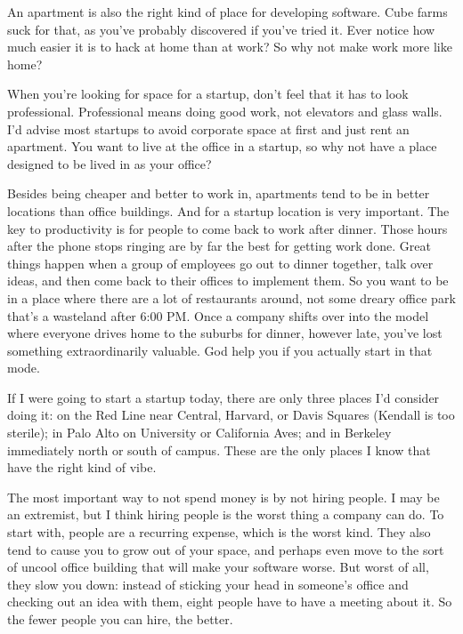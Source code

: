An apartment is also the right kind of
                    place for developing software. Cube farms suck for that, as
                    you've probably discovered if you've tried it. Ever notice
                    how much easier it is to hack at home than at work? So why
                    not make work more like home?

When you're looking
                    for space for a startup, don't feel that it has to look
                    professional. Professional means doing good work, not
                    elevators and glass walls. I'd advise most startups to avoid
                    corporate space at first and just rent an apartment. You
                    want to live at the office in a startup, so why not have a
                    place designed to be lived in as your office?

Besides
                    being cheaper and better to work in, apartments tend to be
                    in better locations than office buildings. And for a startup
                    location is very important. The key to productivity is for
                    people to come back to work after dinner. Those hours after
                    the phone stops ringing are by far the best for getting work
                    done. Great things happen when a group of employees go out
                    to dinner together, talk over ideas, and then come back to
                    their offices to implement them. So you want to be in a
                    place where there are a lot of restaurants around, not some
                    dreary office park that's a wasteland after 6:00 PM. Once a
                    company shifts over into the model where everyone drives
                    home to the suburbs for dinner, however late, you've lost
                    something extraordinarily valuable. God help you if you
                    actually start in that mode.

If I were going to
                    start a startup today, there are only three places I'd
                    consider doing it: on the Red Line near Central, Harvard, or
                    Davis Squares (Kendall is too sterile); in Palo Alto on
                    University or California Aves; and in Berkeley immediately
                    north or south of campus. These are the only places I know
                    that have the right kind of vibe.

The most
                    important way to not spend money is by not hiring people. I
                    may be an extremist, but I think hiring people is the worst
                    thing a company can do. To start with, people are a
                    recurring expense, which is the worst kind. They also tend
                    to cause you to grow out of your space, and perhaps even
                    move to the sort of uncool office building that will make
                    your software worse. But worst of all, they slow you down:
                    instead of sticking your head in someone's office and
                    checking out an idea with them, eight people have to have a
                    meeting about it. So the fewer people you can hire, the
                    better.

